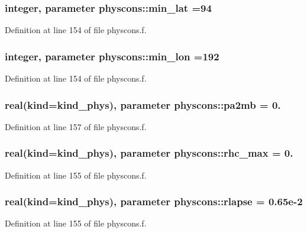\subsubsection[{\texorpdfstring{min\+\_\+lat}{min_lat}}]{\setlength{\rightskip}{0pt plus 5cm}integer, parameter physcons\+::min\+\_\+lat =94}\hypertarget{namespacephyscons_a2bd1eff655c04ff37fa9dc10d3f2bb94}{}\label{namespacephyscons_a2bd1eff655c04ff37fa9dc10d3f2bb94}


Definition at line 154 of file physcons.\+f.

\subsubsection[{\texorpdfstring{min\+\_\+lon}{min_lon}}]{\setlength{\rightskip}{0pt plus 5cm}integer, parameter physcons\+::min\+\_\+lon =192}\hypertarget{namespacephyscons_a058332a27ea45c1188760483078d6472}{}\label{namespacephyscons_a058332a27ea45c1188760483078d6472}


Definition at line 154 of file physcons.\+f.

\subsubsection[{\texorpdfstring{pa2mb}{pa2mb}}]{\setlength{\rightskip}{0pt plus 5cm}real(kind=kind\+\_\+phys), parameter physcons\+::pa2mb = 0.}\hypertarget{namespacephyscons_a6da0ad02b40738e185d46ba92f47434e}{}\label{namespacephyscons_a6da0ad02b40738e185d46ba92f47434e}


Definition at line 157 of file physcons.\+f.

\subsubsection[{\texorpdfstring{rhc\+\_\+max}{rhc_max}}]{\setlength{\rightskip}{0pt plus 5cm}real(kind=kind\+\_\+phys), parameter physcons\+::rhc\+\_\+max = 0.}\hypertarget{namespacephyscons_abd762e7e22635a2f3d25e58b6bcde1fb}{}\label{namespacephyscons_abd762e7e22635a2f3d25e58b6bcde1fb}


Definition at line 155 of file physcons.\+f.

\subsubsection[{\texorpdfstring{rlapse}{rlapse}}]{\setlength{\rightskip}{0pt plus 5cm}real(kind=kind\+\_\+phys), parameter physcons\+::rlapse = 0.\+65e-\/2}\hypertarget{namespacephyscons_a40e396eb1da77e57801ab4d6521aa9d3}{}\label{namespacephyscons_a40e396eb1da77e57801ab4d6521aa9d3}


Definition at line 155 of file physcons.\+f.

